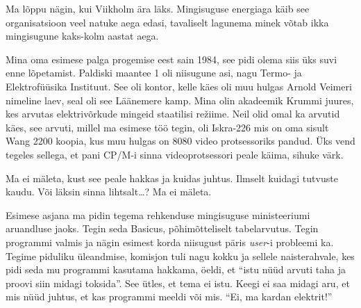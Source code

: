 
Ma lõppu nägin, kui Viikholm ära läks. Mingisuguse energiaga käib see 
organisatsioon veel natuke aega edasi, tavaliselt lagunema minek võtab ikka 
mingisugune kaks-kolm aastat aega.


Mina oma esimese palga progemise eest sain 1984,  see pidi olema siis 
üks suvi enne lõpetamist. Paldiski maantee 1 oli niisugune asi, nagu Termo- ja 
Elektrofüüsika Instituut. See 
oli kontor, kelle käes oli muu hulgas Arnold Veimeri nimeline laev, seal 
oli see Läänemere kamp. Mina olin akadeemik Krummi 
juures, 
kes arvutas elektrivõrkude mingeid staatilisi režiime. Neil olid omal  ka 
arvutid käes, see arvuti, millel ma esimese töö tegin, oli 
Iskra-226 mis on oma sisult Wang 2200 koopia, kus muu 
hulgas on 
8080 video protsessoriks pandud. Üks vend tegeles sellega, et 
pani CP/M-i sinna videoprotsessori peale käima, sihuke värk. 


Ma ei mäleta, kust see  peale hakkas ja kuidas juhtus. Ilmselt kuidagi tutvuste 
kaudu. Või läksin sinna lihtsalt\ldots?  Ma ei mäleta.


Esimese asjana ma pidin tegema rehkenduse mingisuguse 
ministeeriumi aruandluse jaoks. Tegin seda Basicus, 
põhimõtteliselt tabelarvutus. Tegin  programmi valmis ja  nägin esimest korda 
niisugust päris \emph{user}-i probleemi ka. Tegime piduliku üleandmise, 
komisjon tuli 
nagu kokku ja sellele naisterahvale, kes pidi seda mu 
programmi kasutama hakkama, öeldi, et \enquote{istu nüüd arvuti taha ja proovi 
siin midagi toksida}. See ütles, et tema ei istu. Keegi ei saa midagi aru, 
et mis nüüd juhtus, et kas programmi meeldi või mis. \enquote{Ei, ma kardan 
elektrit!}

